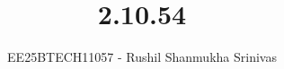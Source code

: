 \documentclass[journal]{IEEEtran}
\begin{document}




\title{2.10.54}
\author{EE25BTECH11057 - Rushil Shanmukha Srinivas
}
{\let\newpage\relax\maketitle}

\renewcommand{\thefigure}{\theenumi}
\renewcommand{\thetable}{\theenumi}
\setlength{\intextsep}{10pt} %

\renewcommand{\thetable}{\theenumi}
\end{document}
